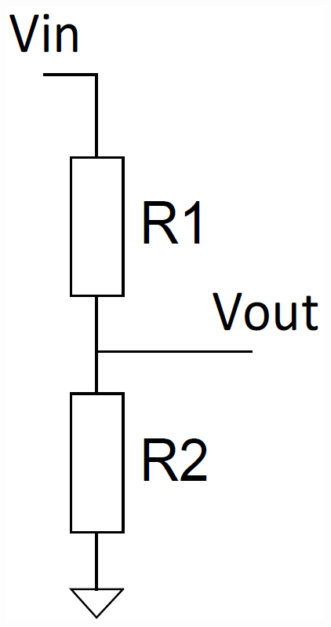 \begin{minipage}[c]{0.13\columnwidth}
    \includegraphics[width=\columnwidth]{images/rauschen_spannungsteiler.png}
\end{minipage}
\hfill
